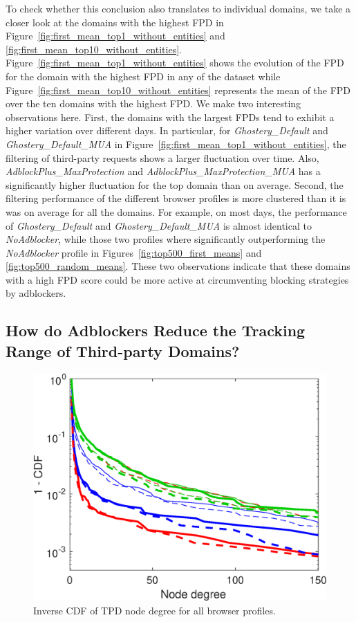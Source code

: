 \documentclass[compsoc, conference, letterpaper, 10pt, times]{IEEEtran}
\begin{document}
To check whether this conclusion also translates to individual domains, we take a closer look at the domains with the highest FPD in Figure~\ref{fig:first_mean_top1_without_entities} and \ref{fig:first_mean_top10_without_entities}. Figure~\ref{fig:first_mean_top1_without_entities} shows the evolution of the FPD for the domain with the highest FPD in any of the dataset while Figure~\ref{fig:first_mean_top10_without_entities} represents the mean of the FPD over the ten domains with the highest FPD. We make two interesting observations here. First, the domains with the largest FPDs tend to exhibit a higher variation over different days. In particular, for \textit{Ghostery\_Default} and \textit{Ghostery\_Default\_MUA} in Figure~\ref{fig:first_mean_top1_without_entities}, the filtering of third-party requests shows a larger fluctuation over time. Also, \textit{AdblockPlus\_MaxProtection} and \textit{AdblockPlus\_MaxProtection\_MUA} has a significantly higher fluctuation for the top domain than on average. Second, the filtering performance of the different browser profiles is more clustered than it is was on average for all the domains. For example, on most days, the performance of \textit{Ghostery\_Default} and \textit{Ghostery\_Default\_MUA} is almost identical to \textit{NoAdblocker}, while those two profiles where significantly outperforming the \textit{NoAdblocker} profile in Figures~\ref{fig:top500_first_means} and \ref{fig:top500_random_means}. These two observations indicate that these domains with a high FPD score could be more active at circumventing blocking strategies by adblockers.  

\subsection{How do Adblockers Reduce the Tracking Range of Third-party Domains?}

\begin{figure}
  \centering
  \includegraphics[width=.45\textwidth]{figures/cdf-third-node-degree.eps}
  \caption{Inverse CDF of TPD node degree for all browser profiles.}
  \label{fig:cdf_first_third_node_degree}
\end{figure}
\end{document}
